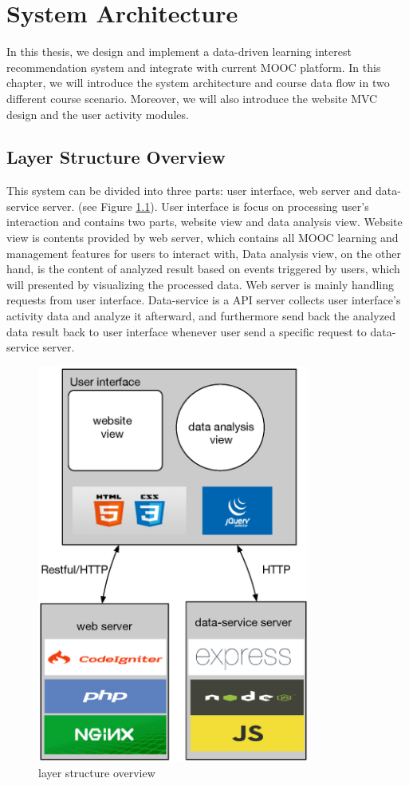 \chapter{System Architecture}\label{cha:Architecture}
In this thesis, we design and implement a data-driven learning interest recommendation system and integrate with current MOOC platform.
In this chapter, we  will introduce the system architecture and course data flow in two different course scenario.
Moreover, we will also introduce the website MVC design and the user activity modules.

\section{Layer Structure Overview}
This system can be divided into three parts: user interface, web server and data-service server. (see Figure \ref{fig:layer-overview}).
User interface is focus on processing user's interaction and contains two parts, website view and data analysis view.
Website view is contents provided by web server, which contains all MOOC learning and management features for users to interact with,
Data analysis view, on the other hand, is the content of analyzed result based on events triggered by users, which will presented by visualizing the processed data.
Web server is mainly handling requests from user interface.
Data-service is a API server collects user interface's activity data and analyze it afterward, and furthermore send back the analyzed data result back to user interface whenever user send a specific request to data-service server.

\begin{figure}[H]
    \centering
    \includegraphics[width = 0.8\textwidth]{fig/layer-structure-overview.eps}
    \caption{layer structure overview}
    \label{fig:layer-overview}
\end{figure}

